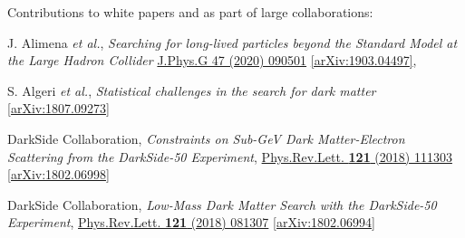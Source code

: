 \documentclass[11pt]{article}
\newenvironment{packed_enumerate}[1][]{
\begin{etaremune}[#1]
  \setlength{\itemsep}{3pt}
  \setlength{\parskip}{0pt}
  \setlength{\parsep}{0pt}}{\end{etaremune}
}
\begin{document}
\noindent
Contributions to white papers and as part of large collaborations:

\begin{packed_enumerate}[start=4]
\item J. Alimena \emph{et al.}, \emph{Searching for long-lived particles beyond the Standard Model at the Large Hadron Collider}  \href{https://iopscience.iop.org/article/10.1088/1361-6471/ab4574}{J.Phys.G 47 (2020) 090501} \href{https://arxiv.org/abs/1903.04497}{[arXiv:1903.04497]}, 

\item S. Algeri \emph{et al.}, \emph{Statistical challenges in the search for dark matter} \href{https://arxiv.org/abs/1807.09273}{[arXiv:1807.09273]}

\item DarkSide Collaboration, \emph{Constraints on Sub-GeV Dark Matter-Electron Scattering from the DarkSide-50 Experiment}, \href{https://journals.aps.org/prl/abstract/10.1103/PhysRevLett.121.111303}{Phys.Rev.Lett. \textbf{121} (2018) 111303} \href{https://arxiv.org/abs/1802.06998}{[arXiv:1802.06998]}

\item DarkSide Collaboration, \emph{Low-Mass Dark Matter Search with the DarkSide-50 Experiment}, \href{https://journals.aps.org/prl/abstract/10.1103/PhysRevLett.121.081307}{Phys.Rev.Lett. \textbf{121} (2018) 081307}  \href{https://arxiv.org/abs/1802.06994}{[arXiv:1802.06994]}
\end{packed_enumerate}
\vspace{2.0mm}

\end{document}
